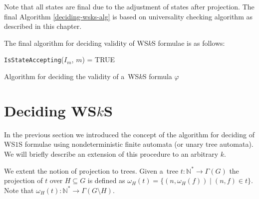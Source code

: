 Note that all states are final due to the adjustment of states after projection.
The final Algorithm \ref{deciding-wsks-alg} is based on universality checking
algorithm as described in this chapter.

The final algorithm for deciding validity of WS$k$S formulae is as follows:

\begin{algorithm}[ht!]
		\BlankLine
		\nl \Return \texttt{IsStateAccepting}($I_m$, $m$) = \textsc{TRUE}
		\BlankLine
		\caption{Algorithm for deciding the validity of a~WS$k$S
		formula $\varphi$}\label{deciding-wsks-alg}
	\end{algorithm}

%    

\section{Deciding WS$k$S}

In the previous section we introduced the concept of the algorithm for deciding
of WS$1$S formulae using nondeterministic finite automata (or unary tree
automata).
We will briefly describe an extension of this procedure to an arbitrary $k$.

We extent the notion of projection to trees. Given a~tree $t :
\mathbb{N}^* \rightarrow \Gamma(G)$ the projection of $t$ over $H \subseteq G$
is defined as $\omega_H(t) = \{(n, \omega_H(f)) \mid (n, f) \in t\}$. Note that
$\omega_H(t) : \mathbb{N}^* \rightarrow \Gamma(G\setminus H)$.

